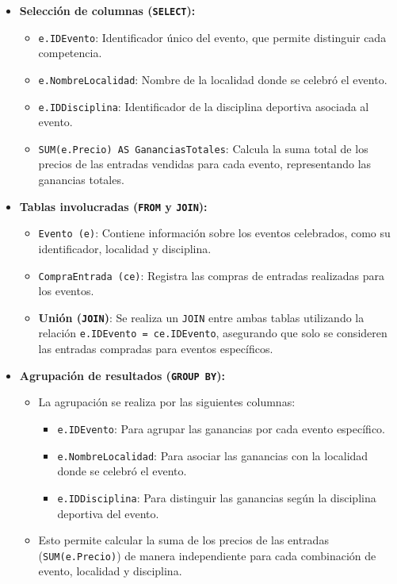 \begin{itemize}
   \item \textbf{Selección de columnas (\texttt{SELECT}):}
   \begin{itemize}
       \item \texttt{e.IDEvento}: Identificador único del evento, que permite distinguir cada competencia.
       \item \texttt{e.NombreLocalidad}: Nombre de la localidad donde se celebró el evento.
       \item \texttt{e.IDDisciplina}: Identificador de la disciplina deportiva asociada al evento.
       \item \texttt{SUM(e.Precio) AS GananciasTotales}: Calcula la suma total de los precios de las entradas vendidas para cada evento, representando las ganancias totales.
   \end{itemize}

   \item \textbf{Tablas involucradas (\texttt{FROM} y \texttt{JOIN}):}
   \begin{itemize}
       \item \texttt{Evento (e)}: Contiene información sobre los eventos celebrados, como su identificador, localidad y disciplina.
       \item \texttt{CompraEntrada (ce)}: Registra las compras de entradas realizadas para los eventos.
       \item \textbf{Unión (\texttt{JOIN})}: Se realiza un \texttt{JOIN} entre ambas tablas utilizando la relación \texttt{e.IDEvento = ce.IDEvento}, asegurando que solo se consideren las entradas compradas para eventos específicos.
   \end{itemize}

   \item \textbf{Agrupación de resultados (\texttt{GROUP BY}):}
   \begin{itemize}
       \item La agrupación se realiza por las siguientes columnas:
       \begin{itemize}
           \item \texttt{e.IDEvento}: Para agrupar las ganancias por cada evento específico.
           \item \texttt{e.NombreLocalidad}: Para asociar las ganancias con la localidad donde se celebró el evento.
           \item \texttt{e.IDDisciplina}: Para distinguir las ganancias según la disciplina deportiva del evento.
       \end{itemize}
       \item Esto permite calcular la suma de los precios de las entradas (\texttt{SUM(e.Precio)}) de manera independiente para cada combinación de evento, localidad y disciplina.
   \end{itemize}


\end{itemize}
